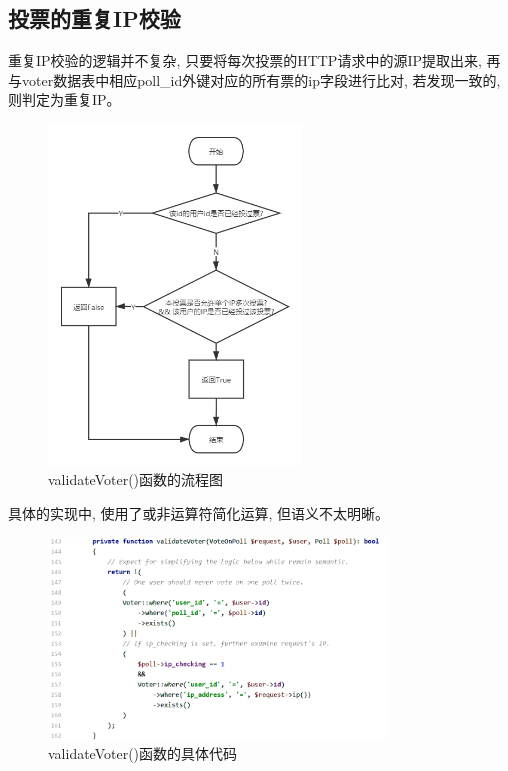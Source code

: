\newpage

\subsection{投票的重复IP校验}

重复IP校验的逻辑并不复杂, 只要将每次投票的HTTP请求中的源IP提取出来, 再与voter数据表中相应poll\_id外键对应的所有票的ip字段进行比对, 若发现一致的, 则判定为重复IP。

\begin{figure}[hb]
    \centering
    \includegraphics[width=0.60\textwidth]{support-files/4.5.2-validate-voter-flowchart.png}
    \caption{validateVoter()函数的流程图}
    \label{fig:validatevoterchart}
\end{figure}


具体的实现中, 使用了或非运算符简化运算, 但语义不太明晰。

\begin{figure}[h]
    \centering
    \includegraphics[width=0.8\textwidth]{support-files/4.5.2-validate-voter-code.png}
    \caption{validateVoter()函数的具体代码}
    \label{fig:validatevotercode}
\end{figure}

